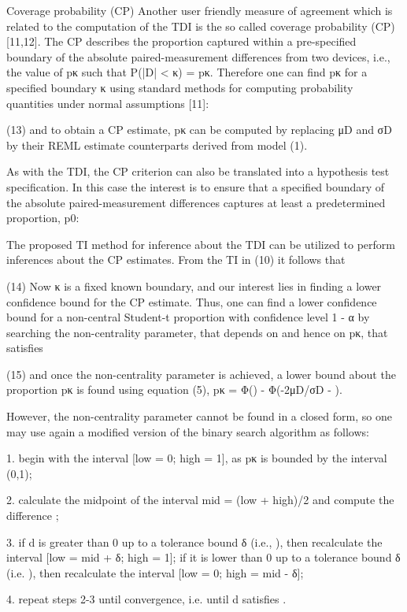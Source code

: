 Coverage probability (CP)
Another user friendly measure of agreement which is related to the computation of the TDI is the so called coverage probability (CP) [11,12]. The CP describes the proportion captured within a pre-specified boundary of the absolute paired-measurement differences from two devices, i.e., the value of pκ such that P(|D| < κ) = pκ. Therefore one can find pκ for a specified boundary κ using standard methods for computing probability quantities under normal assumptions [11]:

(13)
and to obtain a CP estimate, pκ can be computed by replacing μD and σD by their REML estimate counterparts derived from model (1).

As with the TDI, the CP criterion can also be translated into a hypothesis test specification. In this case the interest is to ensure that a specified boundary of the absolute paired-measurement differences captures at least a predetermined proportion, p0:


The proposed TI method for inference about the TDI can be utilized to perform inferences about the CP estimates. From the TI in (10) it follows that

(14)
Now κ is a fixed known boundary, and our interest lies in finding a lower confidence bound for the CP estimate. Thus, one can find a lower confidence bound for a non-central Student-t proportion with confidence level 1 - α by searching the non-centrality parameter, that depends on  and hence on pκ, that satisfies

(15)
and once the non-centrality parameter  is achieved, a lower bound about the proportion pκ is found using equation (5), pκ = Φ() - Φ(-2μD/σD - ).

However, the non-centrality parameter cannot be found in a closed form, so one may use again a modified version of the binary search algorithm as follows:

1. begin with the interval [low = 0; high = 1], as pκ is bounded by the interval (0,1);

2. calculate the midpoint of the interval mid = (low + high)/2 and compute the difference ;

3. if d is greater than 0 up to a tolerance bound δ (i.e., ), then recalculate the interval [low = mid + δ; high = 1]; if it is lower than 0 up to a tolerance bound δ (i.e. ), then recalculate the interval [low = 0; high = mid - δ];

4. repeat steps 2-3 until convergence, i.e. until d satisfies .
